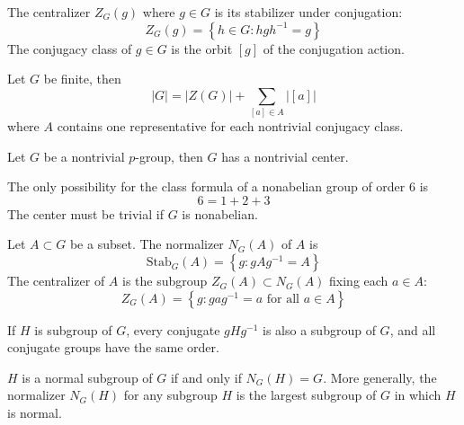 \documentclass[openany]{book}
\begin{document}
\begin{defn}
    The centralizer $Z_G(g)$ where $g\in G$ is its stabilizer under conjugation:
    \begin{equation*}
        Z_G(g)=\left\{h\in G: hgh^{-1}=g\right\}
    \end{equation*}
    The conjugacy class of $g\in G$ is the orbit $[g]$ of the conjugation action.
\end{defn}


\begin{prop}
    Let $G$ be finite, then 
    \begin{equation*}
        |G|=|Z(G)|+\sum_{[a]\in A}|[a]|
    \end{equation*}
    where $A$ contains one representative for each nontrivial conjugacy class.
\end{prop}


\begin{cor}
    Let $G$ be a nontrivial $p$-group, then $G$ has a nontrivial center.
\end{cor}

\begin{prop}
    The only possibility for the class formula of a nonabelian group of order $6$ is 
    \begin{equation*}
        6=1+2+3
    \end{equation*}
    The center must be trivial if $G$ is nonabelian.
\end{prop}


\begin{defn}[normalizer]
    Let $A\subset G$ be a subset. The normalizer $N_G(A)$ of $A$ is 
    \begin{equation*}
        \text{Stab}_G(A)=\left\{g: gAg^{-1}=A\right\}
    \end{equation*}
    The centralizer of $A$ is the subgroup $Z_G(A)\subset N_G(A)$ fixing each $a\in A$:
    \begin{equation*}
        Z_G(A)=\left\{ g: gag^{-1}=a \text{ for all } a\in A\right\}
    \end{equation*}

    If $H$ is subgroup of $G$, every conjugate $gHg^{-1}$ is also a subgroup of $G$, and all conjugate groups have the same order.
\end{defn}

\begin{prop}[*]
    $H$ is a normal subgroup of $G$ if and only if $N_G(H)=G$. More generally, the normalizer $N_G(H)$ for any subgroup $H$ is the largest subgroup of $G$ in which $H$ is normal.
\end{prop}
\end{document}
